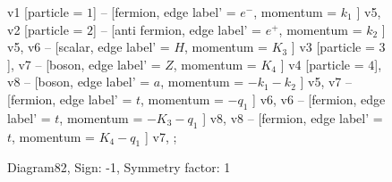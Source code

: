 \documentclass{revtex4}
\begin{document}
\begin{figure}[!htb]
\begin{center}
{    %
v1 [particle = \(1\)] -- [fermion, edge label' = \(e^{-}\), momentum = \(k_{1}\) ] v5, 
v2 [particle = \(2\)] -- [anti fermion, edge label' = \(e^{+}\), momentum = \(k_{2}\) ] v5, 
v6 -- [scalar, edge label' = \(H\), momentum = \(K_{3}\) ] v3 [particle = \(3\)], 
v7 -- [boson, edge label' = \(Z\), momentum = \(K_{4}\) ] v4 [particle = \(4\)], 
v8 -- [boson, edge label' = \(a\), momentum = \(-k_{1} - k_{2}\) ] v5, 
v7 -- [fermion, edge label' = \(t\), momentum = \(-q_{1}\) ] v6, 
v6 -- [fermion, edge label' = \(t\), momentum = \(-K_{3} - q_{1}\) ] v8, 
v8 -- [fermion, edge label' = \(t\), momentum = \(K_{4} - q_{1}\) ] v7, 
};
\end{center}
\caption{Diagram82, Sign: -1, Symmetry factor: 1}
\end{figure}
\newpage
\end{document}
